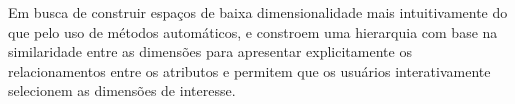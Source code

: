 


Em busca de construir espaços de baixa dimensionalidade mais intuitivamente do que pelo uso de métodos automáticos, \cite{Yang2003} e \cite{Ward2003} constroem uma hierarquia com base na similaridade entre as dimensões para apresentar explicitamente os relacionamentos entre os atributos e permitem que os usuários interativamente selecionem as dimensões de interesse. 


